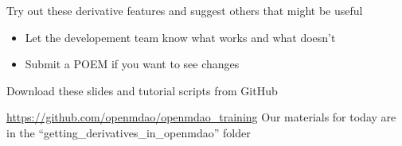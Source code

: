 \documentclass[aspectratio=169, usenames, dvipsnames, 14pt]{beamer}
\begin{document}
\begin{frame}{Try out these derivative features and suggest others that might be useful}

	\begin{itemize}
		\item Let the developement team know what works and what doesn't
		\item Submit a POEM if you want to see changes
	\end{itemize}

\end{frame}

\begingroup
{}
\begin{frame}[plain]{}

\end{frame}
\endgroup

\begin{frame}{Download these slides and tutorial scripts from GitHub}

	\url{https://github.com/openmdao/openmdao_training}
	\newline \newline Our materials for today are in the ``getting\_derivatives\_in\_openmdao'' folder
	
\end{frame}                        
\end{document}
